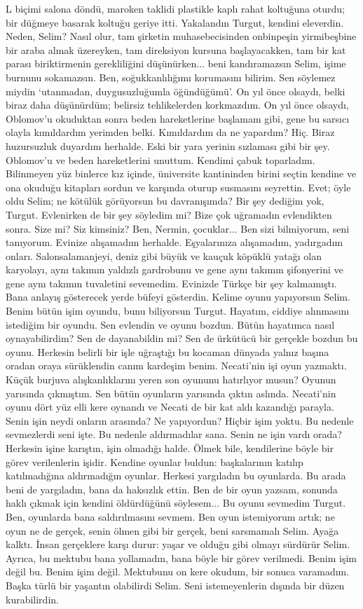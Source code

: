 \documentclass[a5paper,13pt]{scrbook}
\begin{document}
L biçimi salona döndü, maroken taklidi plastikle kaplı rahat koltuğuna oturdu;
bir düğmeye basarak koltuğu geriye itti. Yakalandın Turgut, kendini eleverdin.
Neden, Selim? Nasıl olur, tam şirketin muhasebecisinden onbinpeşin yirmibeşbine
bir araba almak üzereyken, tam direksiyon kursuna başlayacakken, tam bir kat
parası biriktirmenin gerekliliğini düşünürken... beni kandıramazsın Selim, işime
burnunu sokamazsın. Ben, soğukkanlılığımı korumasını bilirim. Sen söylemez
miydin `utanmadan, duygusuzluğumla öğündüğümü'. On yıl önce olsaydı, belki biraz
daha düşünürdüm; belirsiz tehlikelerden korkmazdım. On yıl önce olsaydı,
Oblomov'u okuduktan sonra beden hareketlerine başlamam gibi, gene bu sarsıcı
olayla kımıldardım yerimden belki. Kımıldardım da ne yapardım? Hiç. Biraz
huzursuzluk duyardım herhalde. Eski bir yara yerinin sızlaması gibi bir şey.
Oblomov'u ve beden hareketlerini unuttum. Kendimi çabuk toparladım. Bilinmeyen
yüz binlerce kız içinde, üniversite kantininden birini seçtin kendine ve ona
okuduğu kitapları sordun ve karşında oturup susmasını seyrettin. Evet; öyle oldu
Selim; ne kötülük görüyorsun bu davranışımda? Bir şey dediğim yok, Turgut.
Evlenirken de bir şey söyledim mi? Bize çok uğramadın evlendikten sonra. Size
mi? Siz kimsiniz? Ben, Nermin, çocuklar... Ben sizi bilmiyorum, seni tanıyorum.
Evinize alışamadım herhalde. Eşyalarınıza alışamadım, yadırgadım onları.
Salonsalamanjeyi, deniz gibi büyük ve kauçuk köpüklü yatağı olan karyolayı, aynı
takımın yaldızlı gardrobunu ve gene aynı takımın şifonyerini ve gene aynı
takımın tuvaletini sevemedim. Evinizde Türkçe bir şey kalmamıştı. Bana anlayış
gösterecek yerde büfeyi gösterdin. Kelime oyunu yapıyorsun Selim. Benim bütün
işim oyundu, bunu biliyorsun Turgut. Hayatım, ciddiye alınmasını istediğim bir
oyundu. Sen evlendin ve oyunu bozdun. Bütün hayatımca nasıl oynayabilirdim? Sen
de dayanabildin mi? Sen de ürkütücü bir gerçekle bozdun bu oyunu. Herkesin
belirli bir işle uğraştığı bu kocaman dünyada yalnız başına oradan oraya
sürüklendin canım kardeşim benim. Necati'nin işi oyun yazmaktı. Küçük burjuva
alışkanlıklarını yeren son oyununu hatırlıyor musun? Oyunun yarısında çıkmıştım.
Sen bütün oyunların yarısında çıktın aslında. Necati'nin oyunu dört yüz elli
kere oynandı ve Necati de bir kat aldı kazandığı parayla. Senin işin neydi
onların arasında? Ne yapıyordun? Hiçbir işim yoktu. Bu nedenle sevmezlerdi seni
işte. Bu nedenle aldırmadılar sana. Senin ne işin vardı orada? Herkesin işine
karıştın, işin olmadığı halde. Ölmek bile, kendilerine böyle bir görev
verilenlerin işidir. Kendine oyunlar buldun: başkalarının katılıp katılmadığına
aldırmadığın oyunlar. Herkesi yargıladın bu oyunlarda. Bu arada beni de
yargıladın, bana da haksızlık ettin. Ben de bir oyun yazsam, sonunda haklı
çıkmak için kendini öldürdüğünü söylesem... Bu oyunu sevmedim Turgut. Ben,
oyunlarda bana saldırılmasını sevmem. Ben oyun istemiyorum artık; ne oyun ne de
gerçek, senin ölmen gibi bir gerçek, beni sarsmamalı Selim. Ayağa kalktı. İnsan
gerçeklere karşı durur: yaşar ve olduğu gibi olmayı sürdürür Selim. Ayrıca, bu
mektubu bana yollamadın, bana böyle bir görev verilmedi. Benim işim değil bu.
Benim işim değil. Mektubunu on kere okudum, bir sonuca varamadım. Başka türlü
bir yaşantın olabilirdi Selim. Seni istemeyenlerin dışında bir düzen
kurabilirdin.
\end{document}
